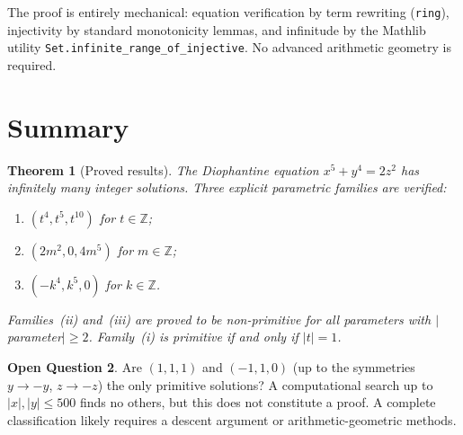 \documentclass[12pt,a4paper]{article}
\newtheorem{theorem}{Theorem}[section]
\theoremstyle{definition}
\newtheorem{openquestion}[theorem]{Open Question}
\newcommand{\Z}{\mathbb{Z}}
\begin{document}
The proof is entirely mechanical: equation verification by term rewriting
(\texttt{ring}), injectivity by standard monotonicity lemmas, and infinitude
by the Mathlib utility \texttt{Set.infinite\_range\_of\_injective}.  No
advanced arithmetic geometry is required.

\section{Summary}\label{sec:summary}

\begin{theorem}[Proved results]
  The Diophantine equation $x^5 + y^4 = 2z^2$ has infinitely many integer
  solutions.  Three explicit parametric families are verified:
  \begin{enumerate}[label=\emph{(\roman*)}]
    \item $(t^4, t^5, t^{10})$ for $t \in \Z$;
    \item $(2m^2, 0, 4m^5)$ for $m \in \Z$;
    \item $(-k^4, k^5, 0)$ for $k \in \Z$.
  \end{enumerate}
  Families~(ii) and~(iii) are proved to be non-primitive for all parameters
  with $|$parameter$| \geq 2$.  Family~(i) is primitive if and only if $|t|=1$.
\end{theorem}

\begin{openquestion}
  Are $(1, 1, 1)$ and $(-1, 1, 0)$ (up to the symmetries $y \to -y$,
  $z \to -z$) the only primitive solutions?  A computational search up
  to $|x|, |y| \leq 500$ finds no others, but this does not constitute
  a proof.  A complete classification likely requires a descent argument
  or arithmetic-geometric methods.
\end{openquestion}
\end{document}
